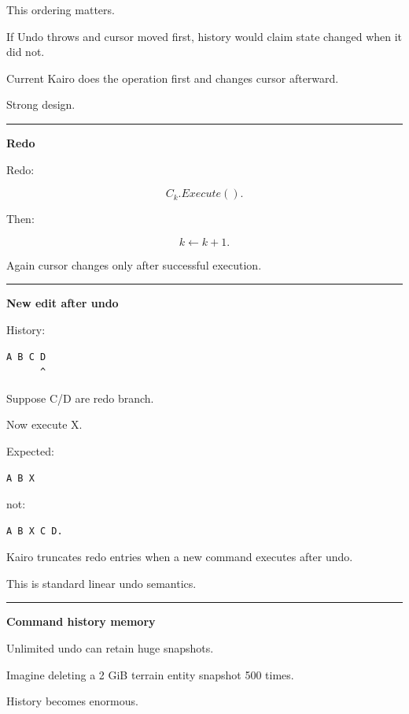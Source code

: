 This ordering matters.

If Undo throws and cursor moved first, history would claim state changed when it did not.

Current Kairo does the operation first and changes cursor afterward.

Strong design.

\begin{center}\rule{0.5\linewidth}{0.5pt}\end{center}

\textbf{Redo}

Redo:

\[
C_k.Execute().
\]

Then:

\[
k\leftarrow k+1.
\]

Again cursor changes only after successful execution.

\begin{center}\rule{0.5\linewidth}{0.5pt}\end{center}

\textbf{New edit after undo}

History:

\begin{verbatim}
A B C D
      ^
\end{verbatim}

Suppose C/D are redo branch.

Now execute X.

Expected:

\begin{verbatim}
A B X
\end{verbatim}

not:

\begin{verbatim}
A B X C D.
\end{verbatim}

Kairo truncates redo entries when a new command executes after undo.

This is standard linear undo semantics.

\begin{center}\rule{0.5\linewidth}{0.5pt}\end{center}

\textbf{Command history memory}

Unlimited undo can retain huge snapshots.

Imagine deleting a 2 GiB terrain entity snapshot 500 times.

History becomes enormous.

